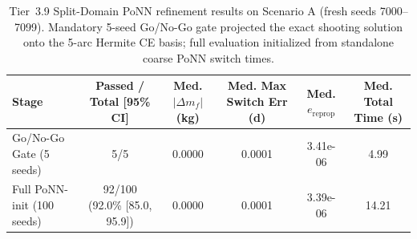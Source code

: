 \begin{table}[t]
\centering
\caption{Tier~3.9 Split-Domain PoNN refinement results on Scenario A (fresh seeds 7000--7099). Mandatory 5-seed Go/No-Go gate projected the exact shooting solution onto the 5-arc Hermite CE basis; full evaluation initialized from standalone coarse PoNN switch times.}
\label{tab:tier3_split_domain}
\begin{tabular}{lccccc}
\toprule
Stage & Passed / Total [95\% CI] & Med. $|\Delta m_f|$ (kg) & Med. Max Switch Err (d) & Med. $e_{\mathrm{reprop}}$ & Med. Total Time (s) \\
\midrule
Go/No-Go Gate (5 seeds) & 5/5 & 0.0000 & 0.0001 & 3.41e-06 & 4.99 \\
Full PoNN-init (100 seeds) & 92/100 (92.0\% [85.0, 95.9]) & 0.0000 & 0.0001 & 3.39e-06 & 14.21 \\
\bottomrule
\end{tabular}
\end{table}
